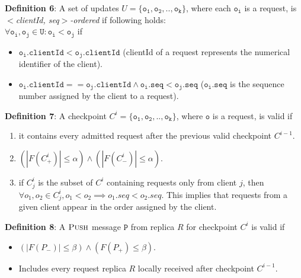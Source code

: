 \documentclass[twocolumn,10pt]{article}
\begin{document}
{\textbf{Definition 6}: A set of updates $U=\{\mathtt{o_1,o_2,..,o_k}\}$, where 
each $\mathtt{o_i}$ is a request, is \emph{$<$clientId, seq$>$-ordered} if following holds:\\
$\forall \mathtt{o_i, o_j \in U: o_i < o_j}$ if 
\begin{itemize}
\item{} $\mathtt{o_i.clientId < o_j.clientId}$ (clientId of a request represents
the numerical identifier of the client).
\item{} $\mathtt{o_i.clientId == o_j.clientId \wedge o_i.{seq} < o_j.{seq}}$ 
($\mathtt{o_i.{seq}}$ is the sequence number assigned by the client to a request).
\end{itemize} 


\textbf{Definition 7}: A checkpoint $C^i=\{\mathtt{o_1,o_2,..,o_k}\}$, where 
$\mathtt{o}$ is a request, is valid if

\begin{enumerate}
\item{} it contains every admitted 
request after the previous valid checkpoint $C^{i-1}$.
\item{}  $(|F(C^{i}_+)| \leq \alpha) \wedge
(|F(C^{i}_-)| \leq \alpha)$.
\item{}if $C^i_j$ is the subset of $C^i$ containing requests only from client $j$, then
$\forall o_1, o_2 \in C^i_j, o_1 < o_2 \implies o_1.seq < o_2.seq$.
This implies that requests from a given client appear in the order assigned by the client.
\end{enumerate}


\textbf{Definition 8}: A $\textsc{Push}$ message $\mathtt{P}$ from replica $R$ for checkpoint $C^i$ is valid if
\begin{itemize}
\item{} $(|F(P_-)| \leq \beta) \wedge (F(P_+) \leq \beta)$.
\item{} Includes every request replica $R$ locally received after checkpoint $C^{i-1}$.
\end{itemize}

}
\end{document}
